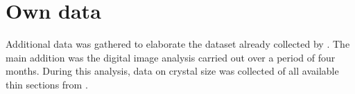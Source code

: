 \section{Own data}
    Additional data was gathered to elaborate the dataset already collected by \Textcite{Heins_1992}. %
    The main addition was the digital image analysis carried out over a period of four months. %
    During this analysis, data on crystal size was collected of all available thin sections from \Textcite{Heins_1992}. %



\cleardoublepage

